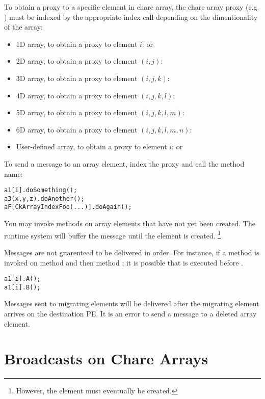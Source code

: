To obtain a proxy to a specific element in chare array, the chare array proxy
(e.g. ) must be indexed by the appropriate index call depending
on the dimentionality of the array:
%
\begin{itemize}
\item 1D array, to obtain a proxy to element $i$:  or
\item 2D array, to obtain a proxy to element $(i,j)$: 
\item 3D array, to obtain a proxy to element $(i,j,k)$: 
\item 4D array, to obtain a proxy to element $(i,j,k,l)$:
\item 5D array, to obtain a proxy to element $(i,j,k,l,m)$:
\item 6D array, to obtain a proxy to element $(i,j,k,l,m,n)$:
\item User-defined array, to obtain a proxy to element $i$: 
  or 
\end{itemize}
%
To send a  message to an array element, index the proxy
and call the method name:
%
\begin{alltt}
a1[i].doSomething();
a3(x,y,z).doAnother();
aF[CkArrayIndexFoo(...)].doAgain();
\end{alltt}

You may invoke methods on array elements that have not yet been created. The
\charmpp{} runtime system will buffer the message until the element is
created. 
\footnote{However, the element must eventually be created.}

Messages are not guarenteed to be delivered in order. For instance, if a method
is invoked on method  and then method ; it is possible that 
is executed before .
%
\begin{alltt}
a1[i].A();
a1[i].B();
\end{alltt}

Messages sent to migrating elements will be delivered after the migrating
element arrives on the destination PE. It is an error to send a message
to a deleted array element.

\section{Broadcasts on Chare Arrays}

